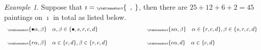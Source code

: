 \documentclass[12pt,a4paper]{amsart}
\numberwithin{equation}{section}
\theoremstyle{remark}
\newtheorem*{Example}{Example}
\let\ytb=\ytableaushort
\newcommand{\tytb}[1]{{\tiny\ytb{#1}}}
\begin{document}
\begin{Example} Suppose that $\imath=\tytb{\ \ ,\  }$, then there are $25+12+6+2=45$ paintings on $\imath$ in total as listed below.
\begin{equation*}\label{eq:sp-nsp.C}
\begin{array}{ll}
   \tytb{\bullet \alpha ,\beta } \quad \alpha, \beta\in \{\bullet, s,r,c,d\} \qquad \qquad  \qquad  & \tytb{s \alpha ,\beta } \quad \alpha\in \{r,c,d\}, \beta\in \{s,r,c,d\} \medskip \medskip \\
     \tytb{r \alpha ,\beta } \quad \alpha\in \{c,d\}, \beta\in \{r,c,d\} \qquad \qquad  \qquad
   &  \tytb{c \alpha , d } \quad  \alpha\in \{c,d\}
     \end{array}
  \end{equation*}

  \end{Example}
\end{document}

